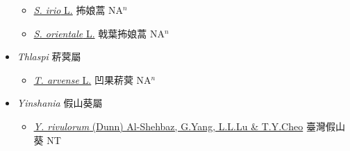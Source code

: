 \begin{itemize}
  \begin{itemize}
        \item[] \href{http://www.theplantlist.org/tpl1.1/search?q=Sisymbrium+irio}{\textit{S. irio} L.}   抪娘蒿 NA$^n$
        \item[] \href{http://www.theplantlist.org/tpl1.1/search?q=Sisymbrium+orientale}{\textit{S. orientale} L.}   戟葉抪娘蒿 NA$^n$
  \end{itemize}
 \item[] \textit{Thlaspi} 菥蓂屬
                    
  \begin{itemize}
        \item[] \href{http://www.theplantlist.org/tpl1.1/search?q=Thlaspi+arvense}{\textit{T. arvense} L.}   凹果菥蓂 NA$^n$
  \end{itemize}
 \item[] \textit{Yinshania} 假山葵屬
                    
  \begin{itemize}
        \item[] \href{http://www.theplantlist.org/tpl1.1/search?q=Yinshania+rivulorum}{\textit{Y. rivulorum} (Dunn) Al-Shehbaz, G.Yang, L.L.Lu \& T.Y.Cheo}     臺灣假山葵 NT
  \end{itemize}
  \end{itemize}
